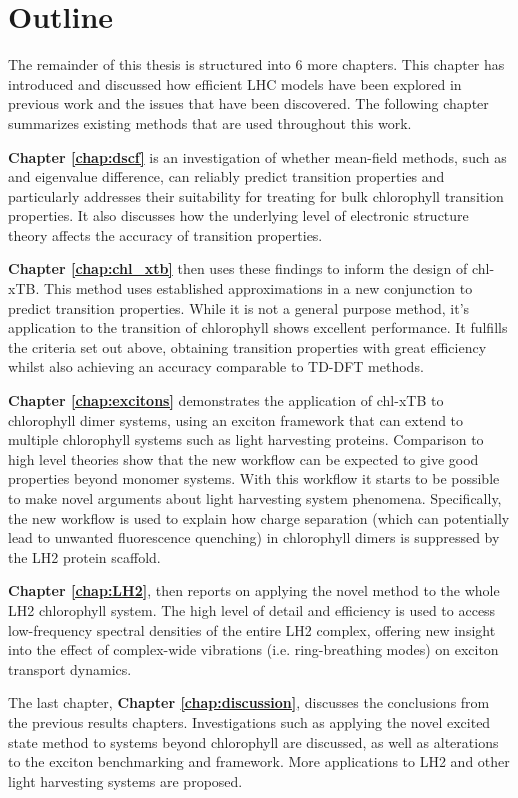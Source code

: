 \section{Outline}
\label{sec:outline}

The remainder of this thesis is structured into 6 more chapters. This chapter has
introduced and discussed how efficient LHC models have been explored in previous 
work and the issues that have been discovered. The following chapter summarizes 
existing methods that are used throughout this work.

\textbf{Chapter \ref{chap:dscf}} is an investigation of whether mean-field methods,
such as \dscf and eigenvalue difference, can reliably predict transition properties 
and particularly addresses their suitability for treating for bulk chlorophyll transition
properties. It also discusses how the underlying level of electronic structure theory
affects the accuracy of transition properties.

\textbf{Chapter \ref{chap:chl_xtb}} then uses these findings to inform the design
of chl-xTB. This method uses established approximations in a new conjunction to 
predict transition properties. While it is not a general purpose method, it's application 
to the \Qy transition of chlorophyll shows excellent performance. It fulfills the 
criteria set out above, obtaining transition properties with great efficiency whilst
also achieving an accuracy comparable to TD-DFT methods.

\textbf{Chapter \ref{chap:excitons}} demonstrates the application of chl-xTB to chlorophyll 
dimer systems, using an exciton framework that can extend to multiple chlorophyll
systems such as light harvesting proteins. Comparison to high level theories show 
that the new workflow can be expected to give good properties beyond monomer systems. 
With this workflow it starts to be possible to make novel arguments about light 
harvesting system phenomena. Specifically, the new workflow is used to explain how
charge separation (which can potentially lead to unwanted fluorescence quenching) 
in chlorophyll dimers is suppressed by the LH2 protein scaffold.

\textbf{Chapter \ref{chap:LH2}}, then reports on applying the novel method to the
whole LH2 chlorophyll system. The high level of detail and efficiency is used to 
access low-frequency spectral densities of the entire LH2 complex, offering new
insight into the effect of complex-wide vibrations (i.e. ring-breathing modes) on
exciton transport dynamics.

The last chapter, \textbf{Chapter \ref{chap:discussion}}, discusses the conclusions
from the previous results chapters. Investigations such as applying the novel excited 
state method to systems beyond chlorophyll are discussed, as well as alterations 
to the exciton benchmarking and framework. More applications to LH2 and other light 
harvesting systems are proposed.

